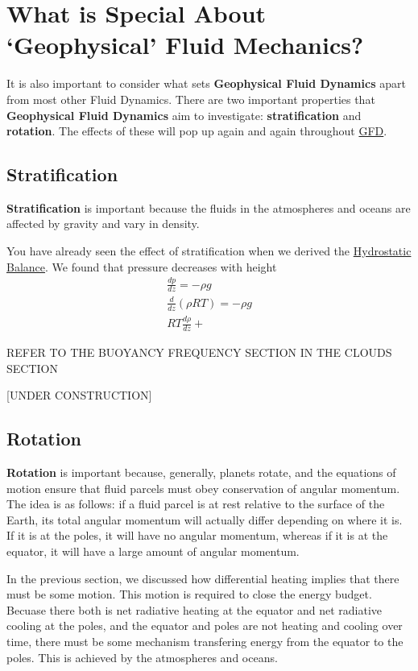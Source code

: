 \section{What is Special About `Geophysical' Fluid Mechanics?}\label{GFD Special}

It is also important to consider what sets \textbf{Geophysical Fluid Dynamics} apart from most other Fluid Dynamics. There are two important properties that \textbf{Geophysical Fluid Dynamics} aim to investigate: \textbf{stratification} and \textbf{rotation}. The effects of these will pop up again and again throughout \hyperref[Geophysical Fluid Dynamics]{GFD}.

\subsection{Stratification}

\textbf{Stratification} is important because the fluids in the atmospheres and oceans are affected by gravity and vary in density. 

You have already seen the effect of stratification when we derived the \hyperref[Hydrostatic Balance]{Hydrostatic Balance}. We found that pressure decreases with height 
\begin{align*}
    \frac{dp}{dz}=-\rho g\\
    \frac{d}{dz}\left( \rho R T \right)=-\rho g\\
    RT \frac{d \rho}{dz} + \frac{}{}
\end{align*}

REFER TO THE BUOYANCY FREQUENCY SECTION IN THE CLOUDS SECTION

[UNDER CONSTRUCTION]

\subsection{Rotation}

\textbf{Rotation} is important because, generally, planets rotate, and the equations of motion ensure that fluid parcels must obey conservation of angular momentum. The idea is as follows: if a fluid parcel is at rest relative to the surface of the Earth, its total angular momentum will actually differ depending on where it is. If it is at the poles, it will have no angular momentum, whereas if it is at the equator, it will have a large amount of angular momentum.

In the previous section, we discussed how differential heating implies that there must be some motion. This motion is required to close the energy budget. Becuase there both is net radiative heating at the equator and net radiative cooling at the poles, and the equator and poles are not heating and cooling over time, there must be some mechanism transfering energy from the equator to the poles. This is achieved by the atmospheres and oceans.

